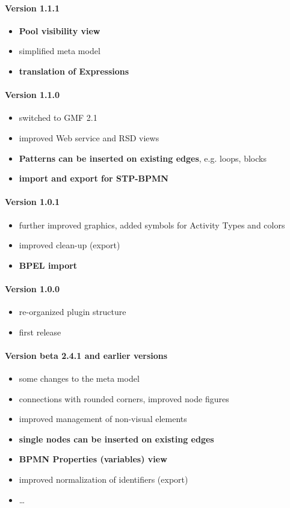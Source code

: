\paragraph{Version 1.1.1}
\begin{itemize}
	\item \textbf{Pool visibility view}
	\item simplified meta model
	\item \textbf{translation of Expressions}
\end{itemize}

\paragraph{Version 1.1.0}
\begin{itemize}
	\item switched to GMF 2.1
	\item improved Web service and RSD views
	\item \textbf{Patterns can be inserted on existing edges}, e.g. loops, blocks
	\item \textbf{import and export for STP-BPMN}
\end{itemize}

\paragraph{Version 1.0.1}
\begin{itemize}
	\item further improved graphics, added symbols for Activity Types and colors
	\item improved clean-up (export)
	\item \textbf{BPEL import}
\end{itemize}

\paragraph{Version 1.0.0}
\begin{itemize}
	\item re-organized plugin structure
	\item first release
\end{itemize}

\paragraph{Version beta 2.4.1 and earlier versions}
\begin{itemize}
	\item some changes to the meta model
	\item connections with rounded corners, improved node figures
	\item improved management of non-visual elements
	\item \textbf{single nodes can be inserted on existing edges}
	\item \textbf{BPMN Properties (variables) view}
	\item improved normalization of identifiers (export)
	\item \dots
\end{itemize}

